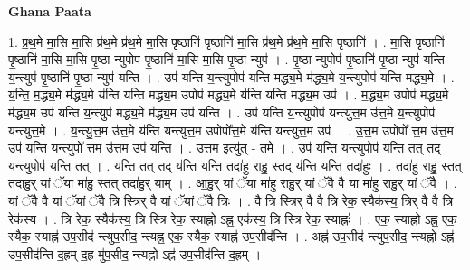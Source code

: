\documentclass[17pt]{extarticle}
\begin{document}
\textbf{Ghana Paata } \newline

1. प्र॒थ॒मे मा॒सि मा॒सि प्र॑थ॒मे प्र॑थ॒मे मा॒सि पृ॒ष्ठानि॑ पृ॒ष्ठानि॑ मा॒सि प्र॑थ॒मे प्र॑थ॒मे मा॒सि पृ॒ष्ठानि॑ । . मा॒सि पृ॒ष्ठानि॑ पृ॒ष्ठानि॑ मा॒सि मा॒सि पृ॒ष्ठा न्युपोप॑ पृ॒ष्ठानि॑ मा॒सि मा॒सि पृ॒ष्ठा न्युप॑ । . पृ॒ष्ठा न्युपोप॑ पृ॒ष्ठानि॑ पृ॒ष्ठा न्युप॑ यन्ति य॒न्त्युप॑ पृ॒ष्ठानि॑ पृ॒ष्ठा न्युप॑ यन्ति । . उप॑ यन्ति य॒न्त्युपोप॑ यन्ति मद्ध्य॒मे म॑द्ध्य॒मे य॒न्त्युपोप॑ यन्ति मद्ध्य॒मे । . य॒न्ति॒ म॒द्ध्य॒मे म॑द्ध्य॒मे य॑न्ति यन्ति मद्ध्य॒म उपोप॑ मद्ध्य॒मे य॑न्ति यन्ति मद्ध्य॒म उप॑ । . म॒द्ध्य॒म उपोप॑ मद्ध्य॒मे म॑द्ध्य॒म उप॑ यन्ति य॒न्त्युप॑ मद्ध्य॒मे म॑द्ध्य॒म उप॑ यन्ति । . उप॑ यन्ति य॒न्त्युपोप॑ यन्त्युत्त॒म उ॑त्त॒मे य॒न्त्युपोप॑ यन्त्युत्त॒मे । . य॒न्त्यु॒त्त॒म उ॑त्त॒मे य॑न्ति यन्त्युत्त॒म उपोपो᳚त्त॒मे य॑न्ति यन्त्युत्त॒म उप॑ । . उ॒त्त॒म उपोपो᳚ त्त॒म उ॑त्त॒म उप॑ यन्ति य॒न्त्युपो᳚ त्त॒म उ॑त्त॒म उप॑ यन्ति । . उ॒त्त॒म इत्यु॑त् - त॒मे । . उप॑ यन्ति य॒न्त्युपोप॑ यन्ति॒ तत् तद् य॒न्त्युपोप॑ यन्ति॒ तत् । . य॒न्ति॒ तत् तद् य॑न्ति यन्ति॒ तदा॑हु राहु॒ स्तद् य॑न्ति यन्ति॒ तदा॑हुः । . तदा॑हु राहु॒ स्तत् तदा॑हु॒र् यां ॅया मा॑हु॒ स्तत् तदा॑हु॒र् याम् । . आ॒हु॒र् यां ॅया मा॑हु राहु॒र् यां ॅवै वै या मा॑हु राहु॒र् यां ॅवै । . यां ॅवै वै यां ॅयां ॅवै त्रि स्त्रिर् वै यां ॅयां ॅवै त्रिः । . वै त्रि स्त्रिर् वै वै त्रि रेक॒ स्यैक॑स्य॒ त्रिर् वै वै त्रि रेक॑स्य । . त्रि रेक॒ स्यैक॑स्य॒ त्रि स्त्रि रेक॒ स्याह्नो ऽह्न॒ एक॑स्य॒ त्रि स्त्रि रेक॒ स्याह्नः॑ । . एक॒ स्याह्नो ऽह्न॒ एक॒ स्यैक॒ स्याह्न॑ उप॒सीद॑ न्त्युप॒सीद॒ न्त्यह्न॒ एक॒ स्यैक॒ स्याह्न॑ उप॒सीद॑न्ति । . अह्न॑ उप॒सीद॑ न्त्युप॒सीद॒ न्त्यह्नो ऽह्न॑ उप॒सीद॑न्ति द॒ह्रम् द॒ह्र मु॑प॒सीद॒ न्त्यह्नो ऽह्न॑ उप॒सीद॑न्ति द॒ह्रम् । \newline
\end{document}

